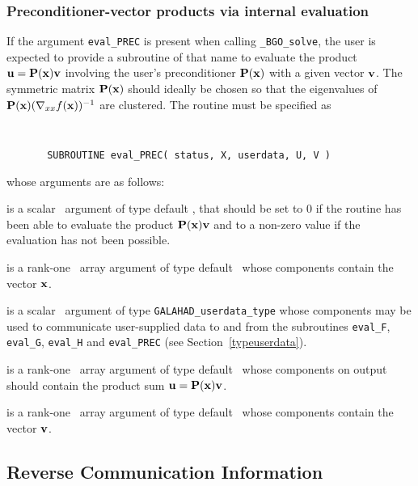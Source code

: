\documentclass{galahad}
\newcommand{\packagename}{BGO}
\newcommand{\fullpackagename}{\libraryname\_\packagename}
\newcommand{\solver}{{\tt \fullpackagename\_solve}}
\begin{document}

\subsubsection{Preconditioner-vector products via internal evaluation\label{pv}}

If the argument {\tt eval\_PREC} is present when calling \solver, the
user is expected to provide a subroutine of that name to evaluate the
product ${\mathbf{u}} = {\mathbf{P}}({\mathbf{x}}) {\mathbf{v}}$ involving the user's preconditioner
${\mathbf{P}}({\mathbf{x}})$ with a given vector ${\mathbf{v}}$. The symmetric matrix ${\mathbf{P}}({\mathbf{x}})$
should ideally be chosen so that the eigenvalues of
${\mathbf{P}}({\mathbf{x}}) (\nabla_{xx} f({\mathbf{x}}))^{-1}$ are clustered.
The routine must be specified as

\def\baselinestretch{0.8}
{\tt
\begin{verbatim}
       SUBROUTINE eval_PREC( status, X, userdata, U, V )
\end{verbatim} }
\def\baselinestretch{1.0}
\noindent whose arguments are as follows:

\begin{description}
 is a scalar \intentout\ argument of type default \integer,
that should be set to 0 if the routine has been able to evaluate the
product ${\mathbf{P}}({\mathbf{x}}) {\mathbf{v}}$
and to a non-zero value if the evaluation has not been possible.

 is a rank-one \intentin\ array argument of type default \realdp\
whose components contain the vector ${\mathbf{x}}$.

 is a scalar \intentinout\ argument of type
{\tt GALAHAD\_userdata\_type} whose components may be used
to communicate user-supplied data to and from the
subroutines {\tt eval\_F}, {\tt eval\_G},
{\tt eval\_H} and {\tt eval\_PREC}
(see Section~\ref{typeuserdata}).

 is a rank-one \intentout\ array argument of type default \realdp\
whose components on output should contain the product
sum ${\mathbf{u}} = {\mathbf{P}}({\mathbf{x}}) {\mathbf{v}}$.

 is a rank-one \intentin\ array argument of type default \realdp\
whose components contain the vector ${\mathbf{v}}$.

\end{description}


\subsection{\label{reverse}Reverse Communication Information}
\end{document}
